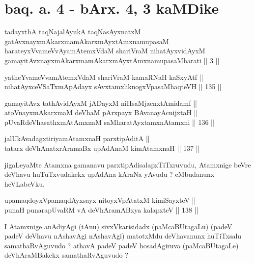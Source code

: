 \section*{baq. a. 4 - bArx. 4,  3 kaMDike}

\begin{shl}
tadayxthA taqNajalAyukA taqNasAyxnatxM gatAvxnayxmAkarxmamAkarxmAyxtAmxnamupasaM harateyxVvameVvAyamAtemxVdaM shariVraM nihatAyx\s vidAyxM gamayitAvxnayxmAkarxmamAkarxmAyxtAmxnamupasaMharati || 3 ||
\end{shl}

\begin{shl}
yatheYvameVvamAtemxVdaM shariVraM kamaRNaH kaSxyAtf || \\
nihatAyxceVSaTxmApAdayx sAvxtamxliknogxVpasaMhaqteVH \hfill || 135 ||  
\end{shl}

\begin{shl}
gamayitAvx tathA\s vidAyxM jADayxM niHsaMjacnxtAmidamf ||  \\
atoV\s nayxmAkarxmaM deVhaM pArxpayx BAvanayA\s cnijxtaH || \\
pUvaRdeVhasathxmAtAmxnaM saMharatAyxtamxnA\s \s tamxni \hfill || 136 ||  
\end{shl}

\begin{shl}
jalUkAvadagxtiriyamAtamxnaH parxtipAditA || \\
tatarx deVhAnatxrAramaBx upAdAnaM kimAtamxnaH \hfill || 137 ||  
\end{shl}

\begin{artha}
jigaLeyaMte Atamxna gamanavu parxtipAdisalapxTiTxruvudu, Atamxnige
beVre deVhavu huTuTxvudakekx upAdAna kAraNa yAvudu ? eMbudanunx
heVLabeVku.
\end{artha}


\begin{shl}
upamaqdoyxVpamaqdAyxsayx nitoyxVpAtatxM kimiSayxteV ||  \\
punaH punarapUvaRM vA deVhAramABxya kalapxteV \hfill || 138 ||  
\end{shl}

\begin{artha}
I Atamxnige anAdiyAgi (tAnu) sivxVkarisidadx (paMcaBUtagaLu) (padeV
padeV deVhavu nAshavAgi nAshavAgi) matotxMdu deVhavanunx huTiTxsalu
samathaRvAguvudo ? athavA padeV padeV hosadAgiruva (paMcaBUtagaLe)
deVhAraMBakekx samathaRvAguvudo ?
\end{artha}

